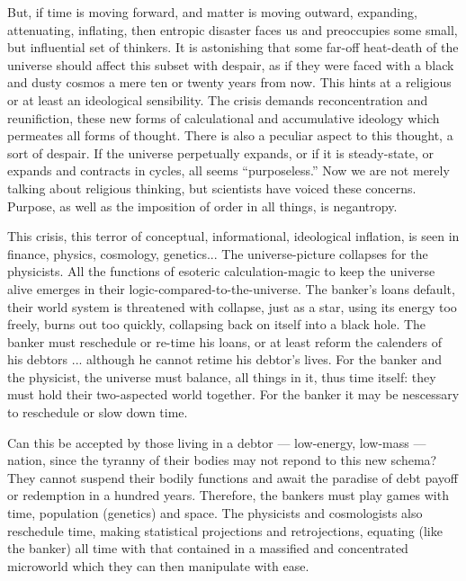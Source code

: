 But, if time is moving forward, and matter
is moving outward, expanding, attenuating,
inflating, then entropic disaster faces us and
preoccupies some small, but influential set
of thinkers. It is astonishing that some far-off
heat-death of the universe should affect this
subset with despair, as if they were faced
with a black and dusty cosmos a mere ten or
twenty years from now. This hints at a religious or at least an ideological sensibility.
The crisis demands reconcentration and reunifiction, these new forms of calculational
and accumulative ideology which permeates
all forms of thought. There is also a peculiar
aspect to this thought, a sort of despair. If the
universe perpetually expands, or if it is
steady-state, or expands and contracts in
cycles, all seems \enquote{purposeless.} Now we are
not merely talking about religious thinking,
but scientists have voiced these concerns.
Purpose, as well as the imposition of order in
all things, is negantropy.

This crisis, this terror of conceptual, informational,
ideological inflation, is seen in finance, physics, cosmology, genetics...
The universe-picture collapses for the physicists. All the functions of esoteric calculation-magic to keep the universe alive emerges
in their logic-compared-to-the-universe. The
banker's loans default, their world system is
threatened with collapse, just as a star, using
its energy too freely, burns out too quickly,
collapsing back on itself into a black hole.
The banker must reschedule or re-time his
loans, or at least reform the calenders of his
debtors ... although he cannot retime his
debtor's lives. For the banker and the physicist, the universe must balance, all things in
it, thus time itself: they must hold their
two-aspected world together. For the banker
it may be nescessary to reschedule or slow
down time.

Can this be accepted by those living
in a debtor --- low-energy, low-mass --- nation,
since the tyranny of their bodies may not
repond to this new schema? They cannot
suspend their bodily functions and await the
paradise of debt payoff or redemption in a
hundred years. Therefore, the bankers must
play games with time, population (genetics)
and space. The physicists and cosmologists
also reschedule time, making statistical projections and retrojections, equating (like the
banker) all time with that contained in
a massified and concentrated microworld
which they can then manipulate with ease.

